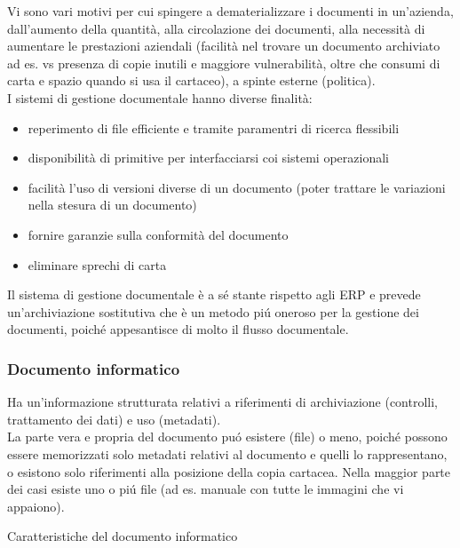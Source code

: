 Vi sono vari motivi per cui spingere a dematerializzare i documenti in
un'azienda, dall'aumento della quantit\`a, alla circolazione dei
documenti, alla necessit\`a di aumentare le prestazioni aziendali
(facilit\`a nel trovare un documento archiviato ad es. vs presenza di
copie inutili e maggiore vulnerabilit\`a, oltre che consumi di carta e
spazio quando si usa il cartaceo), a spinte esterne (politica).\\
I sistemi di gestione documentale hanno diverse finalit\`a:

\begin{itemize}

\item
  reperimento di file efficiente e tramite paramentri di ricerca
  flessibili
\item
  disponibilit\`a di primitive per interfacciarsi coi sistemi operazionali
\item
  facilit\`a l'uso di versioni diverse di un documento (poter trattare le
  variazioni nella stesura di un documento)
\item
  fornire garanzie sulla conformit\`a del documento
\item
  eliminare sprechi di carta
\end{itemize}

Il sistema di gestione documentale \`e a s\'e stante rispetto agli ERP e
prevede un'archiviazione sostitutiva che \`e un metodo pi\'u oneroso per la
gestione dei documenti, poich\'e appesantisce di molto il flusso
documentale.

\subsubsection{Documento informatico}

Ha un'informazione strutturata relativi a riferimenti di archiviazione
(controlli, trattamento dei dati) e uso (metadati).\\
La parte vera e propria del documento pu\'o esistere (file) o meno, poich\'e
possono essere memorizzati solo metadati relativi al documento e quelli
lo rappresentano, o esistono solo riferimenti alla posizione della copia
cartacea. Nella maggior parte dei casi esiste uno o pi\'u file (ad es.
manuale con tutte le immagini che vi appaiono).

Caratteristiche del documento informatico

